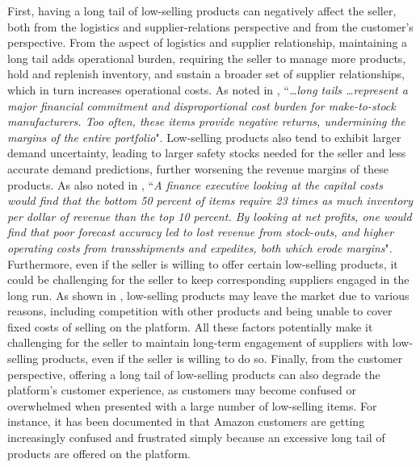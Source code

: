 \documentclass[mnsc,non-blindrev]{informs3}
\theoremstyle{definition}
\begin{document}
{First, having a long tail of low-selling products can negatively affect the seller, both from the logistics and supplier-relations perspective and from the customer’s perspective. From the aspect of logistics and supplier relationship, maintaining a long tail adds operational burden, requiring the seller to manage more products, hold and replenish inventory, and sustain a broader set of supplier relationships, which in turn increases operational costs. As noted in \cite{byrne2015the}, ``\textit{\dots long tails \dots represent a major financial commitment and disproportional cost burden for make-to-stock manufacturers. Too often, these items provide negative returns, undermining the margins of the entire portfolio}". Low-selling products also tend to exhibit larger demand uncertainty, leading to larger safety stocks needed for the seller and less accurate demand predictions, further worsening the revenue margins of these products. As also noted in \cite{byrne2015the}, ``{\it A finance executive looking at the capital costs would find that the bottom 50 percent of items require 23 times as much inventory per dollar of revenue than the top 10 percent. By looking at net profits, one would find that poor forecast accuracy led to lost revenue from stock-outs, and higher operating costs from transshipments and expedites, both which erode margins}". Furthermore, even if the seller is willing to offer certain low-selling products, it could be challenging for the seller to keep corresponding suppliers engaged in the long run. As shown in \cite{de2001competition}, low-selling products may leave the market due to various reasons, including competition with other products and being unable to cover fixed costs of selling on the platform. All these factors potentially make it challenging for the seller to maintain long-term engagement of suppliers with low-selling products, even if the seller is willing to do so. Finally, from the customer perspective, offering a long tail of low-selling products can also degrade the platform’s customer experience, as customers may become confused or overwhelmed when presented with a large number of low-selling items. For instance, it has been documented in \cite{mims2022the} that Amazon customers are getting increasingly confused and frustrated simply because an excessive long tail of products are offered on the platform.

}
\end{document}
